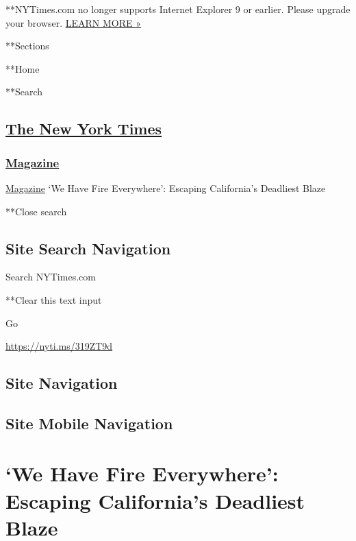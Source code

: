  **NYTimes.com no longer supports Internet Explorer 9 or earlier. Please
upgrade your browser.
\href{http://www.nytimes3xbfgragh.onion/content/help/site/ie9-support.html}{LEARN
MORE »}

**Sections

**Home

**Search

\hypertarget{the-new-york-times}{%
\subsection{\texorpdfstring{\href{http://www.nytimes3xbfgragh.onion/}{The
New York Times}}{The New York Times}}\label{the-new-york-times}}

\hypertarget{-magazine-}{%
\subsubsection{\texorpdfstring{
\href{https://www.nytimes3xbfgragh.onion/section/magazine}{Magazine}
}{ Magazine }}\label{-magazine-}}

 \href{https://www.nytimes3xbfgragh.onion/section/magazine}{Magazine}
\textbar{}`We Have Fire Everywhere': Escaping California's Deadliest
Blaze

**Close search

\hypertarget{site-search-navigation}{%
\subsection{Site Search Navigation}\label{site-search-navigation}}

Search NYTimes.com

**Clear this text input

Go

\url{https://nyti.ms/319ZT9d}

\hypertarget{site-navigation}{%
\subsection{Site Navigation}\label{site-navigation}}

\hypertarget{site-mobile-navigation}{%
\subsection{Site Mobile Navigation}\label{site-mobile-navigation}}

\hypertarget{we-have-fire-everywhere-escaping-californias-deadliest-blaze}{%
\section{`We Have Fire Everywhere': Escaping California's Deadliest
Blaze}\label{we-have-fire-everywhere-escaping-californias-deadliest-blaze}}

